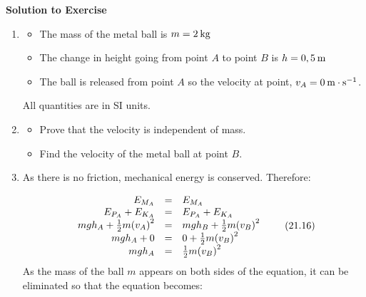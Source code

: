 {\begin{mdframed}[linewidth=4, leftmargin=40, rightmargin=40]
\begin{exercise}
        \label{m38786*solfhsst!!!underscore!!!id2149}\noindent\textbf{Solution to Exercise } \label{m38786*listfhsst!!!underscore!!!id2149}\begin{enumerate}[noitemsep, label=\textbf{Step} \textbf{\arabic*}. ] 
            \leftskip=20pt\rightskip=\leftskip\item  
        \label{m38786*id69799}\begin{itemize}[noitemsep]
            \leftskip=20pt\rightskip=\leftskip\label{m38786*uid90}\item The mass of the metal ball is $m=2\phantom{\rule{2pt}{0ex}}\mathrm{kg}$
\label{m38786*uid91}\item The change in height going from point $A$ to point $B$ is $h=0,5\phantom{\rule{2pt}{0ex}}\mathrm{m}$
\label{m38786*uid92}\item The ball is released from point $A$ so the velocity at point, ${v}_{A}=0\phantom{\rule{2pt}{0ex}}\mathrm{m}\ensuremath{\cdot}\mathrm{s}{}^{-1}$.
\end{itemize}
        \label{m38786*id69924}All quantities are in SI units.\par 
        \item  
        \label{m38786*id69934}\begin{itemize}[noitemsep]
            \leftskip=20pt\rightskip=\leftskip\label{m38786*uid93}\item Prove that the velocity is independent of mass.
\label{m38786*uid94}\item Find the velocity of the metal ball at point $B$.
\end{itemize}
        \item  
        \label{m38786*id69976}As there is no friction, mechanical energy is conserved. Therefore:\par 
        \label{m38786*id69980}\nopagebreak\noindent{}
    \begin{equation}
    \begin{array}{ccc}\hfill {E}_{{M}_{A}}& =& {E}_{{M}_{A}}\hfill \\ \hfill {E}_{{P}_{A}}+{E}_{{K}_{A}}& =& {E}_{{P}_{A}}+{E}_{{K}_{A}}\hfill \\ \hfill mg{h}_{A}+\frac{1}{2}m{\left({v}_{A}\right)}^{2}& =& mg{h}_{B}+\frac{1}{2}m{\left({v}_{B}\right)}^{2}\hfill \\ \hfill mg{h}_{A}+0& =& 0+\frac{1}{2}m{\left({v}_{B}\right)}^{2}\hfill \\ \hfill mg{h}_{A}& =& \frac{1}{2}m{\left({v}_{B}\right)}^{2}\hfill \end{array}\tag{21.16}
      \end{equation}
        \label{m38786*id70278}As the mass of the ball $m$ appears on both sides of the equation, it can be eliminated so that the equation becomes:\par 
        \label{m38786*id70294}\nopagebreak\noindent{}
          

\end{enumerate}
\end{exercise}
\end{mdframed}}
